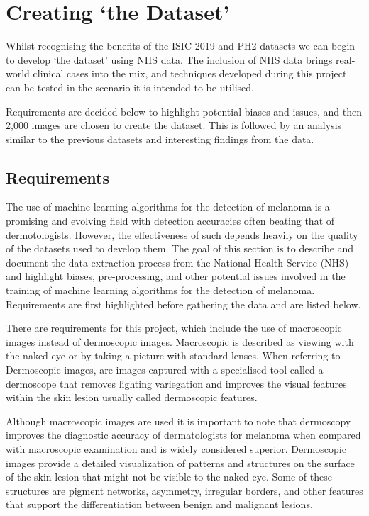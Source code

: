 \pagebreak
\section{Creating `the Dataset'}
Whilst recognising the benefits of the ISIC 2019 and PH2 datasets we can begin to develop `the dataset' using NHS data. The inclusion of NHS data brings real-world clinical cases into the mix, and techniques developed during this project can be tested in the scenario it is intended to be utilised.

Requirements are decided below to highlight potential biases and issues, and then 2,000 images are chosen to create the dataset. This is followed by an analysis similar to the previous datasets and interesting findings from the data.

\subsection{Requirements}
The use of machine learning algorithms for the detection of melanoma is a promising and evolving field with detection accuracies often beating that of dermotologists\cite{Andre2017}. However, the effectiveness of such depends heavily on the quality of the datasets used to develop them\cite{Tae2019}. The goal of this section is to describe and document the data extraction process from the National Health Service (NHS) and highlight biases, pre-processing, and other potential issues involved in the training of machine learning algorithms for the detection of melanoma. Requirements are first highlighted before gathering the data and are listed below.

There are requirements for this project, which include the use of macroscopic images instead of dermoscopic images. Macroscopic is described as viewing with the naked eye or by taking a picture with standard lenses. When referring to Dermoscopic images, are images captured with a specialised tool called a dermoscope that removes lighting variegation and improves the visual features within the skin lesion usually called dermoscopic features.

Although macroscopic images are used it is important to note that dermoscopy improves the diagnostic accuracy of dermatologists for melanoma when compared with macroscopic examination\cite{Wolner2017} and is widely considered superior\cite{Thiers2009}. Dermoscopic images provide a detailed visualization of patterns and structures on the surface of the skin lesion that might not be visible to the naked eye\cite{Thiers2009}. Some of these structures are pigment networks, asymmetry, irregular borders, and other features that support the differentiation between benign and malignant lesions\cite{Thiers2009}. 

